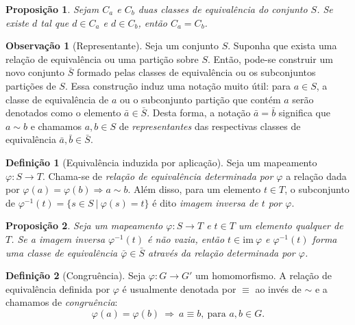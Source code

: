 \documentclass[a4paper,12pt]{report}
\theoremstyle{plain}
\newtheorem{proposicao}{Proposição}[section]
\theoremstyle{definition}
\newtheorem{definicao}{Definição}[section]
\newtheorem{observacao}{Observação}[section]
\begin{document}
\begin{proposicao}
	Sejam \(C_a\) e \(C_b\) duas classes de equivalência do conjunto \(S\). Se existe \(d\) tal que \(d\in C_a\) e \(d\in C_b\), então \(C_a = C_b\).
\end{proposicao}

\begin{observacao}[Representante]
	Seja um conjunto \(S\). Suponha que exista uma relação de equivalência
	ou uma partição sobre \(S\). Então, pode-se construir um novo conjunto
	\(\bar{S}\) formado pelas classes de equivalência ou os subconjuntos
	partições de \(S\). Essa construção induz uma notação muito útil: para
	\(a\in S\), a classe de equivalência de \(a\) ou o subconjunto partição
	que contém \(a\) serão denotados como o elemento
	\(\bar{a} \in \bar{S}\). Desta forma, a notação \(\bar{a} = \bar{b}\)
	significa que \(a \sim b\) e chamamos \(a,b \in S\) de
	\emph{representantes} das respectivas classes de equivalência
	\(\bar{a}, \bar{b} \in \bar{S}\).
\end{observacao}

\begin{definicao}[Equivalência induzida por aplicação]
	Seja um mapeamento \(\varphi: S \longrightarrow T\).
	Chama-se de \emph{relação de equivalência determinada por \(\varphi\)} a
	relação dada por \(\varphi(a) = \varphi(b) \Rightarrow a \sim b\). Além
	disso, para um elemento \(t\in T\), o subconjunto de
	\(\varphi^{-1}(t) = \{s \in S\ | \ \varphi(s) = t\}\) é dito
	\emph{imagem inversa de \(t\) por \(\varphi\)}.
\end{definicao}

\begin{proposicao}
	Seja um mapeamento \(\varphi: S \longrightarrow T\)
	e \(t \in T\) um elemento qualquer de \(T\). Se a imagem inversa
	\(\varphi^{-1}(t)\) é não vazia, então \(t \in \text{im}\ \varphi\) e
	\(\varphi^{-1}(t)\) forma uma classe de equivalência
	\(\bar{\varphi}\in \bar{S}\) através da relação determinada por
	\(\varphi\).	
\end{proposicao}

\begin{definicao}[Congruência]
	Seja \(\varphi: G\longrightarrow G'\) um
	homomorfismo. A relação de equivalência definida por \(\varphi\) é
	usualmente denotada por \(\equiv\) ao invés de \(\sim\) e a chamamos de
	\emph{congruência}:
	\[\varphi(a) = \varphi(b) \ \Rightarrow \ a \equiv b, \ \text{para }a,b \in G.\]	
\end{definicao}
\end{document}
